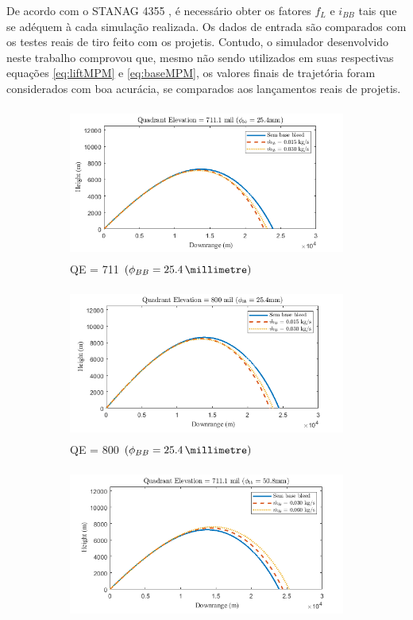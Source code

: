 De acordo com o STANAG 4355 \cite{stanag4355}, é necessário obter os fatores \(f_{L}\) e \(i_{BB}\) tais que se adéquem à cada simulação realizada. Os dados de entrada são comparados com os testes reais de tiro feito com os projetis. Contudo, o simulador desenvolvido neste trabalho comprovou que, mesmo não sendo utilizados em suas respectivas equações \ref{eq:liftMPM} e \ref{eq:baseMPM}, os valores finais de trajetória foram considerados com boa acurácia, se comparados aos lançamentos reais de projetis.

\begin{figure}[!ht]
	\centering
	\begin{subfigure}[b]{0.47\textwidth}
        \centering
        \includegraphics[height=5cm,width=\textwidth]{trajetoria_thallyo_wallace_basebleed-foto1.png}
        \caption{QE = \qty{711}{\milliradian} \(\left(\phi_{BB} = \qty{25,4}{\millimetre}\right)\)}
        \label{fig:trajetoria-711mil-1pol}
    \end{subfigure}
    \hfill
    \begin{subfigure}[b]{0.47\textwidth}
        \centering
        \includegraphics[height=5cm,width=\textwidth]{trajetoria_thallyo_wallace_basebleed-foto2.png}
        \caption{QE = \qty{800}{\milliradian} \(\left(\phi_{BB} = \qty{25,4}{\millimetre}\right)\)}
        \label{fig:trajetoria-800mil-1pol}
    \end{subfigure}
    \hfill
    \begin{subfigure}[b]{0.47\textwidth}
        \centering
        \includegraphics[height=5cm,width=\textwidth]{trajetoria_thallyo_wallace_basebleed-foto3.png}

\end{subfigure}
\end{figure}
